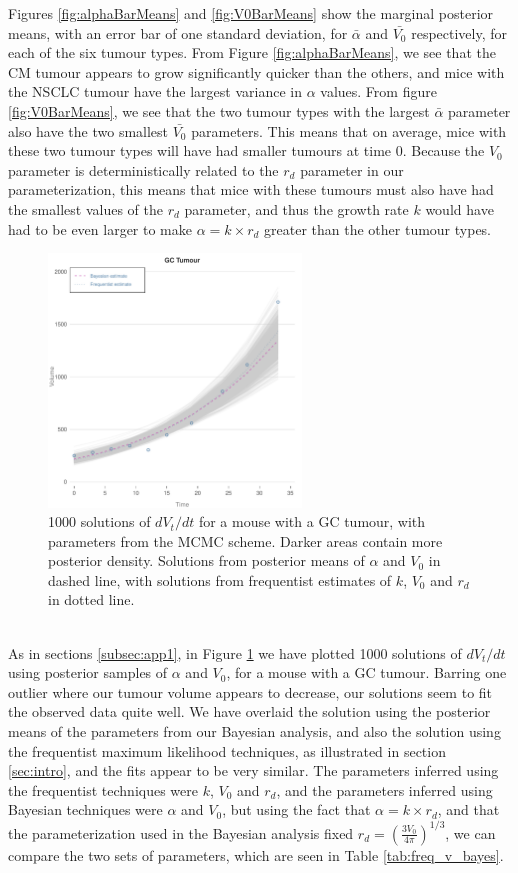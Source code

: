 \documentclass[11pt,a4paper]{article}
\begin{document}
Figures \ref{fig:alphaBarMeans} and \ref{fig:V0BarMeans} show the marginal posterior means, with an error bar of one standard deviation, for $\bar{\alpha}$ and $\bar{V_0}$ respectively, for each of the six tumour types. From Figure \ref{fig:alphaBarMeans}, we see that the CM tumour appears to grow significantly quicker than the others, and mice with the NSCLC tumour have the largest variance in $\alpha$ values. From figure \ref{fig:V0BarMeans}, we see that the two tumour types with the largest $\bar{\alpha}$ parameter also have the two smallest $\bar{V_0}$ parameters. This means that on average, mice with these two tumour types will have had smaller tumours at time 0. Because the $V_0$ parameter is deterministically related to the $r_d$ parameter in our parameterization, this means that mice with these tumours must also have had the smallest values of the $r_d$ parameter, and thus the growth rate $k$ would have had to be even larger to make $\alpha = k \times r_d$ greater than the other tumour types.
\begin{figure}
\centering
\includegraphics[width=0.6\textwidth]{GC_sols.pdf}
\caption{1000 solutions of $dV_t/dt$ for a mouse with a GC tumour, with parameters from the MCMC scheme. Darker areas contain more posterior density. Solutions from posterior means of $\alpha$ and $V_0$ in dashed line, with solutions from frequentist estimates of $k$, $V_0$ and $r_d$ in dotted line.}
\label{fig:GC_sols}
\end{figure}
\\
As in sections \ref{subsec:app1}, in Figure \ref{fig:GC_sols} we have plotted 1000 solutions of $dV_t/dt$ using posterior samples of $\alpha$ and $V_0$, for a mouse with a GC tumour. Barring one outlier where our tumour volume appears to decrease, our solutions seem to fit the observed data quite well. We have overlaid the solution using the posterior means of the parameters from our Bayesian analysis, and also the solution using the frequentist maximum likelihood techniques, as illustrated in section \ref{sec:intro}, and the fits appear to be very similar. The parameters inferred using the frequentist techniques were $k$, $V_0$ and $r_d$, and the parameters inferred using Bayesian techniques were $\alpha$ and $V_0$, but using the fact that $\alpha = k \times r_d$, and that the parameterization used in the Bayesian analysis fixed $r_d = \left(\frac{3V_0}{4 \pi}\right)^{1/3}$, we can compare the two sets of parameters, which are seen in Table \ref{tab:freq_v_bayes}.
\end{document}

